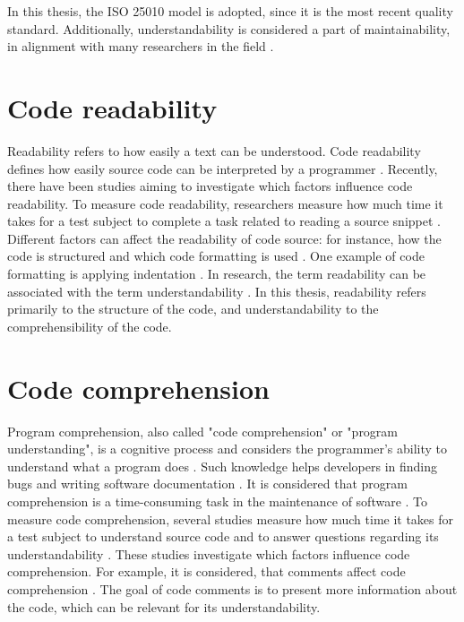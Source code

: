 In this thesis, the ISO 25010 model is adopted, since it is the most recent quality standard. Additionally, understandability is considered a part of maintainability, in alignment with many researchers in the field \cite{xia2017measuring}. 



\section{Code readability}

Readability refers to how easily a text can be understood. Code readability defines how easily source code can be interpreted by a programmer \cite{bakhuizen2019comments}.  Recently, there have been studies aiming to investigate which factors influence code readability.
To measure code readability, researchers measure how much time it takes for a test subject to complete a task related to reading a source snippet  \cite{bakhuizen2019comments}.   Different factors can affect the readability of code source: for instance, how the code is structured and which code formatting is used  \cite{bakhuizen2019comments}.  One example of code formatting is applying indentation \cite{buse2009learning}. In research, the term readability can be associated with the term understandability \cite{winkler2024investigating}. In this thesis, readability refers primarily to the structure of the code, and understandability to the comprehensibility of the code.


\section{Code comprehension}

Program comprehension, also called "code comprehension" or "program understanding", is a cognitive process and considers the programmer's ability to understand what a program does \cite{karahasanovic2007comprehension}. Such knowledge helps developers in finding bugs and writing software documentation \cite{xia2017measuring}.
It is considered that program comprehension is a time-consuming task in the maintenance of software \cite{8075175}. To measure code comprehension, several studies measure how much time it takes for a test subject to understand source code and to answer questions regarding its understandability \cite{wagner2021code}. These studies investigate which factors influence code comprehension. For example, it is considered, that comments affect code comprehension \cite{de2011comment}. The goal of code comments is to present more information about the code, which can be relevant for its understandability.

